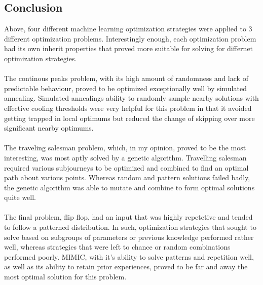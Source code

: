 \documentclass[h]{article}
\begin{document}
\subsection*{ Conclusion}  
Above, four different machine learning optimization strategies were applied to 3 
different optimization problems.  Interestingly enough, each optimization 
problem had its own inherit properties that proved more suitable for solving for 
differnet optimization strategies. 
\\ \\
The continous peaks problem, with its high amount of randomness and lack of 
predictable behaviour, proved to be optimized exceptionally well by simulated 
annealing.  Simulated annealings ability to randomly sample nearby solutions 
with effective cooling thresholds were very helpful for this problem in that it avoided getting trapped in local 
optimums but reduced the change of skipping over more significant nearby optimums.
\\ \\
The traveling salesman problem, which, in my opinion, proved to be the most 
interesting, was most aptly solved by a genetic algorithm.  Travelling salesman 
required various subjourneys to be optimized and combined to find an optimal 
path about various points.  Whereas random and pattern solutions failed badly, 
the genetic algorithm was able to mutate and combine to form optimal solutions 
quite well.
\\ \\
The final problem, flip flop, had an input that was highly repetetive and tended to follow 
a patterned distribution.  In such, optimization strategies that sought to solve 
based on subgroups of parameters or previous knowledge performed rather well, 
whereas strategies that were left to chance or random combinations performed 
poorly.  MIMIC, with it's ability to solve patterns and repetition well, as well 
as its ability to retain prior experiences, proved to be far and away the most optimal solution for this problem. 
\end{document}
